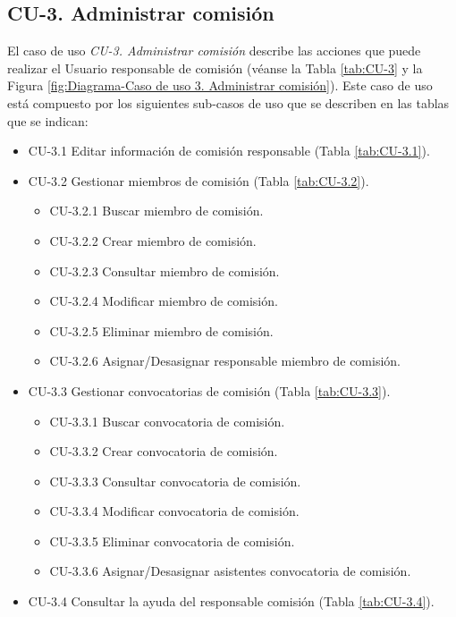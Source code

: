 \subsection{CU-3. Administrar comisión}\label{sec:CU-3}    
El caso de uso \textit{CU-3. Administrar comisión} describe las acciones que puede realizar el Usuario responsable de comisión (véanse la Tabla \ref{tab:CU-3} y la Figura \ref{fig:Diagrama-Caso de uso 3. Administrar comisión}). Este caso de uso está compuesto por los siguientes sub-casos de uso que se describen en las tablas que se indican:
\begin{itemize}
  \item CU-3.1 Editar información de comisión responsable (Tabla \ref{tab:CU-3.1}).
  \item CU-3.2 Gestionar miembros de comisión (Tabla \ref{tab:CU-3.2}).
          \begin{itemize}
            \item CU-3.2.1 Buscar miembro de comisión.
            \item CU-3.2.2 Crear  miembro de comisión.
            \item CU-3.2.3 Consultar miembro de comisión.
            \item CU-3.2.4 Modificar miembro de comisión.
            \item CU-3.2.5 Eliminar miembro de comisión.
            \item CU-3.2.6 Asignar/Desasignar responsable miembro de comisión.
        \end{itemize}
  \item CU-3.3 Gestionar convocatorias de comisión (Tabla \ref{tab:CU-3.3}).
          \begin{itemize}
            \item CU-3.3.1 Buscar convocatoria de comisión.
            \item CU-3.3.2 Crear convocatoria de comisión.
            \item CU-3.3.3 Consultar convocatoria de comisión.
            \item CU-3.3.4 Modificar convocatoria de comisión.
            \item CU-3.3.5 Eliminar convocatoria de comisión.
            \item CU-3.3.6 Asignar/Desasignar asistentes convocatoria de comisión.

        \end{itemize}
 \item CU-3.4 Consultar la ayuda del responsable comisión (Tabla \ref{tab:CU-3.4}).
\end{itemize}


